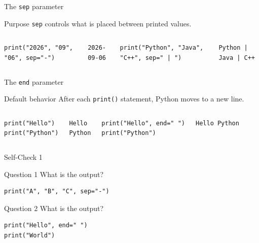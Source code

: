 \documentclass[aspectratio=169,10pt]{beamer}
\begin{document}
\begin{frame}[fragile]{The \texttt{sep} parameter}
\begin{block}{Purpose}
\texttt{sep} controls what is placed between printed values.
\end{block}
\begin{columns}[T,onlytextwidth]
\begin{lstlisting}
print("2026", "09", "06", sep="-")
\end{lstlisting}
\begin{verbatim}
2026-09-06
\end{verbatim}
\begin{lstlisting}
print("Python", "Java", "C++", sep=" | ")
\end{lstlisting}
\begin{verbatim}
Python | Java | C++
\end{verbatim}
\end{columns}
\end{frame}

\begin{frame}[fragile]{The \texttt{end} parameter}
\begin{block}{Default behavior}
After each \texttt{print()} statement, Python moves to a new line.
\end{block}
\begin{columns}[T,onlytextwidth]
\begin{lstlisting}
print("Hello")
print("Python")
\end{lstlisting}
\begin{verbatim}
Hello
Python
\end{verbatim}
\begin{lstlisting}
print("Hello", end=" ")
print("Python")
\end{lstlisting}
\begin{verbatim}
Hello Python
\end{verbatim}
\end{columns}
\end{frame}

\begin{frame}[fragile]{Self-Check 1}
\begin{block}{Question 1}
What is the output?
\begin{lstlisting}
print("A", "B", "C", sep="-")
\end{lstlisting}
\end{block}
\begin{block}{Question 2}
What is the output?
\begin{lstlisting}
print("Hello", end=" ")
print("World")
\end{lstlisting}
\end{block}
\end{frame}
\end{document}
